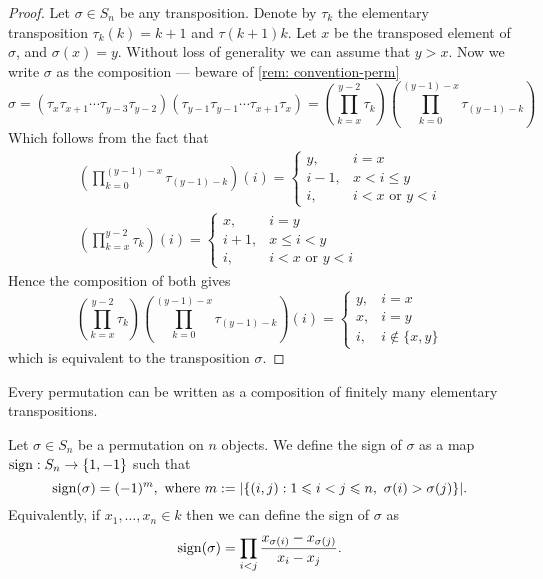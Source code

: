 \begin{proof}
  Let \(\sigma \in S_n\) be any transposition. Denote by \(\tau_k\) the
  elementary transposition \(\tau_k(k) = k + 1\) and \(\tau(k + 1) k\). Let
  \(x\) be the transposed element of \(\sigma\), and \(\sigma(x) = y\). Without
  loss of generality we can assume that \(y > x\). Now we write \(\sigma\) as
  the composition --- beware of \cref{rem: convention-perm}
  \[
    \sigma = \left(\tau_x \tau_{x + 1} \cdots \tau_{y - 3} \tau_{y - 2} \right)
    \left( \tau_{y - 1} \tau_{y - 1} \cdots \tau_{x + 1} \tau_{x} \right)
    = \left( \prod_{k = x}^{y-2} \tau_k \right)
    \left( \prod_{k = 0}^{(y - 1) - x} \tau_{(y-1) - k} \right)
  \]
  Which follows from the fact that
  \begin{gather*}
    \left( \prod_{k = 0}^{(y - 1) - x} \tau_{(y-1) - k} \right)(i) =
    \begin{cases}
      y, &i = x \\
      i - 1, &x < i \leq y \\
      i, &i < x \text{ or } y < i
    \end{cases}
    \\
    \left( \prod_{k = x}^{y-2} \tau_k \right)(i) =
    \begin{cases}
      x, &i = y \\
      i + 1, &x \leq i < y \\
      i, &i < x \text{ or } y < i
    \end{cases}
  \end{gather*}
  Hence the composition of both gives
  \[
    \left( \prod_{k = x}^{y-2} \tau_k \right)
    \left( \prod_{k = 0}^{(y - 1) - x} \tau_{(y-1) - k} \right)(i) =
    \begin{cases}
      y, &i = x \\
      x, &i = y \\
      i, &i \not\in \{x, y\}
    \end{cases}
  \]
  which is equivalent to the transposition \(\sigma\).
\end{proof}

\begin{corollary}
  Every permutation can be written as a composition of finitely many elementary
  transpositions.
\end{corollary}

\begin{definition}[Sign]
  \label{def: sign}
  Let \(\sigma \in S_n\) be a permutation on \(n\) objects. We define
  the sign of \(\sigma\) as a map \(\operatorname{sign}: S_n \to
  \{1, -1\}\) such that
  \[
    \operatorname{sign}(\sigma) = (-1)^m, \text{ where }
    m := |\{(i, j) : 1 \leqslant i < j \leqslant n,\ \sigma(i) > \sigma(j)\}|.
  \]
  Equivalently, if \(x_1, \dots, x_n \in k\) then we can define the
  sign of \(\sigma\) as
  \[
    \operatorname{sign}(\sigma) = \prod_{i < j} \frac{x_{\sigma(i)} -
    x_{\sigma(j)}}{x_i - x_j}.
  \]
\end{definition}

